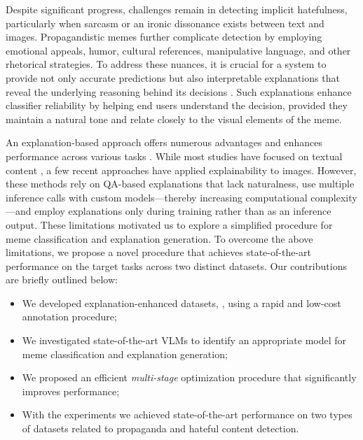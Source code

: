 Despite significant progress, challenges remain in detecting implicit hatefulness, particularly when sarcasm or an ironic dissonance exists between text and images. Propagandistic memes further complicate detection by employing emotional appeals, humor, cultural references, manipulative language, and other rhetorical strategies. To address these nuances, it is crucial for a system to provide not only accurate predictions but also interpretable explanations that reveal the underlying reasoning behind its decisions \cite{hee2023decoding, yang2023hare, huang_chain_2023, sun_text_2023}. Such explanations enhance classifier reliability by helping end users understand the decision, provided they maintain a natural tone and relate closely to the visual elements of the meme.

An explanation-based approach offers numerous advantages and enhances performance across various tasks \cite{li2022explanations, magister2022teaching, nandi2024safe, kumari2024m3hop}. While most studies have focused on textual content \cite{li2022explanations, magister2022teaching}, a few recent approaches \cite{nandi2024safe, kumari2024m3hop} have applied explainability to images. However, these methods rely on QA-based explanations that lack naturalness, use multiple inference calls with custom models—thereby increasing computational complexity—and employ explanations only during training rather than as an inference output. These limitations motivated us to explore a simplified procedure for meme classification and explanation generation. To overcome the above limitations, we propose a novel procedure that achieves state-of-the-art performance on the target tasks across two distinct datasets. Our contributions are briefly outlined below: 

\begin{itemize}[noitemsep,topsep=0pt,labelsep=.5em]
    \item We developed explanation-enhanced datasets, \memex{}, using a rapid and low-cost annotation procedure;
    \item We investigated state-of-the-art VLMs to identify an appropriate model for meme classification and explanation generation;
    \item We proposed an efficient \textit{multi-stage} optimization procedure that significantly improves performance;
    \item With the experiments we achieved state-of-the-art performance on two types of datasets related to propaganda and hateful content detection.
\end{itemize}

